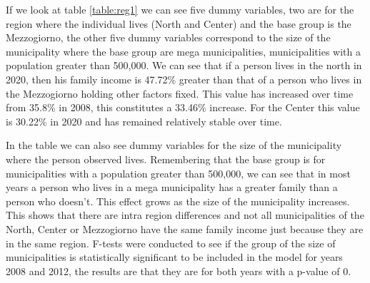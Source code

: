 \documentclass[12pt]{article}
\begin{document}
\begin{spacing}{1.5}

If we look at table \ref{table:reg1} we can see five dummy variables, two are for the region where the individual lives (North and Center) and the base group is the Mezzogiorno, the other five dummy variables correspond to the size of the municipality where the base group are mega municipalities, municipalities with a population greater than 500,000. We can see that if a person lives in the north in 2020, then his family income is 47.72\% greater than that of a person who lives in the Mezzogiorno holding other factors fixed. This value has increased over time from 35.8\% in 2008, this constitutes a 33.46\% increase. For the Center this value is 30.22\% in 2020 and has remained relatively stable over time.

In the table we can also see dummy variables for the size of the municipality where the person observed lives. Remembering that the base group is for municipalities with a population greater than 500,000, we can see that in most years a person who lives in a mega municipality has a greater family than a person who doesn't. This effect grows as the size of the municipality increases. This shows that there are intra region differences and not all municipalities of the North, Center or Mezzogiorno have the same family income just because they are in the same region. F-tests were conducted to see if the group of the size of municipalities is statistically significant to be included in the model for years 2008 and 2012, the results are that they are for both years with a p-value of 0.


\end{spacing}
\end{document}
